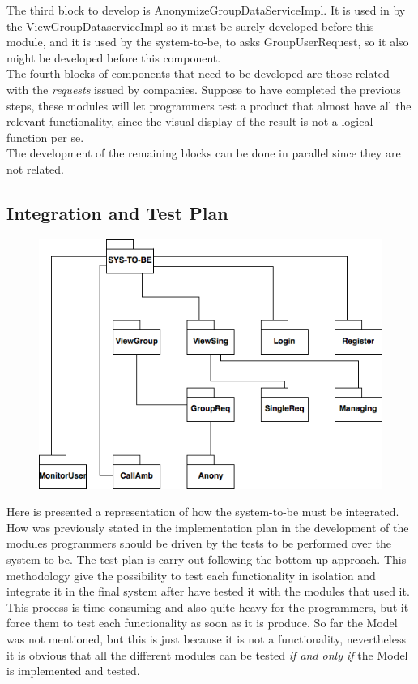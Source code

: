 \documentclass{article}
\begin{document}
The third block to develop is AnonymizeGroupDataServiceImpl. It is used in by the ViewGroupDataserviceImpl so it must be surely developed before this module, and it is used by the system-to-be, to asks GroupUserRequest, so it also might be developed before this component. \\
The fourth blocks of components that need to be developed are those related with the \emph{requests} issued by companies. Suppose to have completed the previous steps, these modules will let programmers test a product that almost have all the relevant functionality, since the visual display of the result is not a logical function per se. \\
The development of the remaining blocks can be done in parallel since they are not related.  
\subsection{Integration and Test Plan}
\begin{figure}[h!]
\centering
    \textbf{}\par\medskip
	\includegraphics[width= \linewidth]{Test.png}
\end{figure}
Here is presented a representation of how the system-to-be must be integrated. How was previously stated in the implementation plan in the development of the modules programmers should be driven by the tests to be performed over the system-to-be. The test plan is carry out following the bottom-up approach. This methodology give the possibility to test each functionality in isolation and integrate it in the final system after have tested it with the modules that used it. This process is time consuming and also quite heavy for the programmers, but it force them to test each functionality as soon as it is produce. So far the Model was not mentioned, but this is just because it is not a functionality, nevertheless it is obvious that all the different modules can be tested \emph{if and only if} the Model is implemented and tested. 
\newpage
\end{document}
